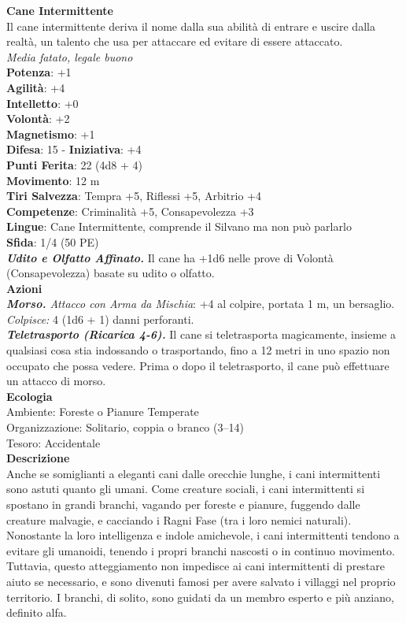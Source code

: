 \begin{multicols}{2}
\medskip\textbf{Cane Intermittente}\\
Il cane intermittente deriva il nome dalla sua abilità di entrare e uscire dalla realtà, un talento che usa per attaccare ed evitare di essere attaccato. \\
\emph{Media fatato, legale buono}\\
\textbf{Potenza}: +1\\
\textbf{Agilità}: +4\\
\textbf{Intelletto}: +0\\
\textbf{Volontà}: +2\\
\textbf{Magnetismo}: +1\\
\textbf{Difesa}: 15 - \textbf{Iniziativa}: +4\\
\textbf{Punti Ferita}: 22 (4d8 + 4)\\
\textbf{Movimento}: 12 m\\
\textbf{Tiri Salvezza}:  Tempra +5, Riflessi +5, Arbitrio +4 \\
\textbf{Competenze}: Criminalità +5, Consapevolezza +3\\
\textbf{Lingue}: Cane Intermittente, comprende il Silvano ma non può parlarlo\\
\textbf{Sfida}: 1/4 (50 PE)\smallskip\\
\emph{\textbf{Udito e Olfatto Affinato.}} Il cane ha +1d6 nelle prove di Volontà (Consapevolezza) basate su udito o olfatto.\\
\smallskip\textbf{Azioni}\\
\emph{\textbf{Morso.} Attacco con Arma da Mischia}: +4 al colpire, portata 1 m, un bersaglio.\\
\emph{Colpisce:} 4 (1d6 + 1) danni perforanti.\\
\emph{\textbf{Teletrasporto (Ricarica 4-6).}} Il cane si teletrasporta magicamente, insieme a qualsiasi cosa stia indossando o trasportando, fino a 12 metri in uno spazio non occupato che possa vedere. Prima o dopo il teletrasporto, il cane può effettuare un attacco di morso.\\
\textbf{Ecologia}\\
Ambiente: Foreste o Pianure Temperate\\
Organizzazione: Solitario, coppia o branco (3–14)\\
Tesoro: Accidentale\\
\textbf{Descrizione}\\

Anche se somiglianti a eleganti cani dalle orecchie lunghe, i cani intermittenti sono astuti quanto gli umani. Come creature sociali, i cani intermittenti si spostano in grandi branchi, vagando per foreste e pianure, fuggendo dalle creature malvagie, e cacciando i Ragni Fase (tra i loro nemici naturali). Nonostante la loro intelligenza e indole amichevole, i cani intermittenti tendono a evitare gli umanoidi, tenendo i propri branchi nascosti o in continuo movimento. Tuttavia, questo atteggiamento non impedisce ai cani intermittenti di prestare aiuto se necessario, e sono divenuti famosi per avere salvato i villaggi nel proprio territorio. I branchi, di solito, sono guidati da un membro esperto e più anziano, definito alfa.\\


\end{multicols}
